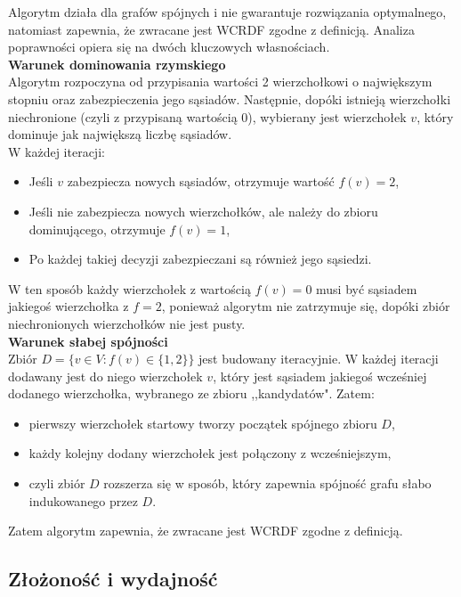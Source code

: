    Algorytm działa dla grafów spójnych i nie gwarantuje rozwiązania optymalnego, natomiast zapewnia, że zwracane jest WCRDF zgodne z definicją. Analiza poprawności opiera się na dwóch kluczowych własnościach.\\
    \textbf{Warunek dominowania rzymskiego}\\
    Algorytm rozpoczyna od przypisania wartości 2 wierzchołkowi o największym stopniu oraz zabezpieczenia jego sąsiadów. Następnie, dopóki istnieją wierzchołki niechronione (czyli z przypisaną wartością 0), wybierany jest wierzchołek $v$, który dominuje jak największą liczbę sąsiadów.\\
    W każdej iteracji:
    \begin{itemize}
        \item Jeśli $v$ zabezpiecza nowych sąsiadów, otrzymuje wartość $f(v) = 2$,
        \item Jeśli nie zabezpiecza nowych wierzchołków, ale należy do zbioru dominującego, otrzymuje $f(v) = 1$,
        \item Po każdej takiej decyzji zabezpieczani są również jego sąsiedzi.
    \end{itemize}

    W ten sposób każdy wierzchołek z wartością $f(v) = 0$ musi być sąsiadem jakiegoś wierzchołka z $f = 2$, ponieważ algorytm nie zatrzymuje się, dopóki zbiór niechronionych wierzchołków nie jest pusty.\\
    \textbf{Warunek słabej spójności}\\
    Zbiór $D = \{v \in V : f(v) \in \{1,2\} \}$ jest budowany iteracyjnie. W każdej iteracji dodawany jest do niego wierzchołek $v$, który jest sąsiadem jakiegoś wcześniej dodanego wierzchołka, wybranego ze zbioru ,,kandydatów".
    Zatem:
    \begin{itemize}
        \item pierwszy wierzchołek startowy tworzy początek spójnego zbioru $D$,
        \item każdy kolejny dodany wierzchołek jest połączony z wcześniejszym,
        \item czyli zbiór $D$ rozszerza się w sposób, który zapewnia spójność grafu słabo indukowanego przez $D$.
    \end{itemize}
    Zatem algorytm zapewnia, że zwracane jest WCRDF zgodne z definicją.

    \subsection{Złożoność i wydajność}

